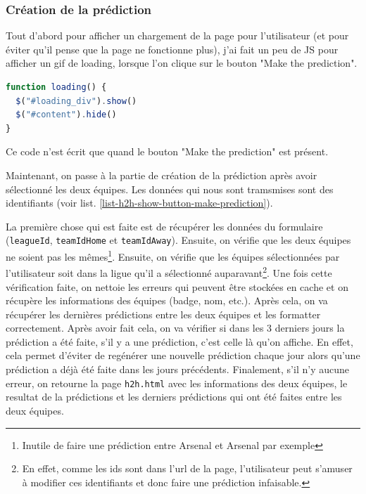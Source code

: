 \documentclass[a4paper,14pt]{extarticle}
\begin{document}
{

\subsubsection{Création de la prédiction}

Tout d'abord pour afficher un chargement de la page pour l'utilisateur (et pour éviter qu'il pense que la page ne fonctionne plus), j'ai fait un peu de JS pour afficher un gif de loading, lorsque l'on clique sur le bouton "Make the prediction". 

\begin{lstlisting}[language=JavaScript, firstnumber=1, caption=Affichage du loading lors de la création de la prédiction, captionpos=b, label=jsLoading]
function loading() {
  $("#loading_div").show()
  $("#content").hide()
}
\end{lstlisting}

Ce code n'est écrit que quand le bouton "Make the prediction" est présent.

Maintenant, on passe à la partie de création de la prédiction après avoir sélectionné les deux équipes. Les données qui nous sont tramsmises sont des identifiants (voir list. \ref{list-h2h-show-button-make-prediction}).

La première chose qui est faite est de récupérer les données du formulaire (\texttt{leagueId}, \texttt{teamIdHome} et \texttt{teamIdAway}). Ensuite, on vérifie que les deux équipes ne soient pas les mêmes\footnote{Inutile de faire une prédiction entre Arsenal et Arsenal par exemple}. Ensuite, on vérifie que les équipes sélectionnées par l'utilisateur soit dans la ligue qu'il a sélectionné auparavant\footnote{En effet, comme les ids sont dans l'url de la page, l'utilisateur peut s'amuser à modifier ces identifiants et donc faire une prédiction infaisable.}. Une fois cette vérification faite, on nettoie les erreurs qui peuvent être stockées en cache et on récupère les informations des équipes (badge, nom, etc.). Après cela, on va récupérer les dernières prédictions entre les deux équipes et les formatter correctement. Après avoir fait cela, on va vérifier si dans les 3 derniers jours la prédiction a été faite, s'il y a une prédiction, c'est celle là qu'on affiche. En effet, cela permet d'éviter de regénérer une nouvelle prédiction chaque jour alors qu'une prédiction a déjà été faite dans les jours précédents. Finalement, s'il n'y aucune erreur, on retourne la page \texttt{h2h.html} avec les informations des deux équipes, le resultat de la prédictions et les derniers prédictions qui ont été faites entre les deux équipes.

}
\end{document}
